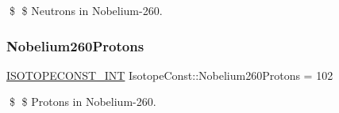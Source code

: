\$ \$ Neutrons in Nobelium-\/260. \mbox{\label{group___isotope_const-_nobelium-_no260_ga7cef088dcc440a0517e9c445f2f78b1f}} 
\subsubsection{\texorpdfstring{Nobelium260\+Protons}{Nobelium260Protons}}
{\footnotesize\ttfamily \mbox{\hyperlink{group___isotope_const-_macros_ga5f18360b3e99483a35c32d789e62621c}{I\+S\+O\+T\+O\+P\+E\+C\+O\+N\+S\+T\+\_\+\+I\+NT}} Isotope\+Const\+::\+Nobelium260\+Protons = 102}

\$ \$ Protons in Nobelium-\/260. 